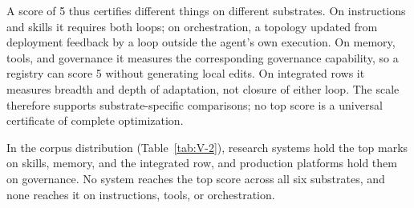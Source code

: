 \documentclass[
  11pt,
]{article}
\newcounter{none} %
\begin{document}
A score of 5 thus certifies different things on different substrates. On instructions and skills it requires both loops; on orchestration, a topology updated from deployment feedback by a loop outside the agent's own execution. On memory, tools, and governance it measures the corresponding governance capability, so a registry can score 5 without generating local edits. On integrated rows it measures breadth and depth of adaptation, not closure of either loop. The scale therefore supports substrate-specific comparisons; no top score is a universal certificate of complete optimization.

In the corpus distribution (Table~\ref{tab:V-2}), research systems hold the top marks on skills, memory, and the integrated row, and production platforms hold them on governance. No system reaches the top score across all six substrates, and none reaches it on instructions, tools, or orchestration.
\end{document}
